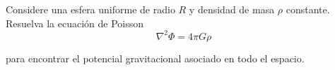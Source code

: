 
\question[1] 
Considere una esfera uniforme de radio $R$ y densidad de masa $\rho$ constante.
Resuelva la ecuación de Poisson
\[
\nabla^2 \Phi = 4\pi G \rho \nonumber
\]

para encontrar el potencial gravitacional
asociado en todo el espacio.

\droptotalpoints

